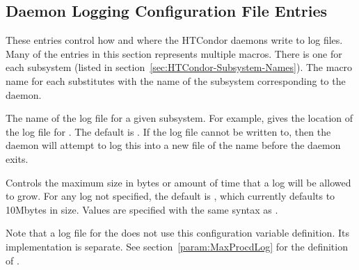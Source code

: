 \subsection{\label{sec:Daemon-Logging-Config-File-Entries}Daemon Logging Configuration File Entries} 

These entries control how and where the HTCondor daemons write to log
files.  Many of the entries in this section represents multiple
macros. There is one for each subsystem (listed
in section~\ref{sec:HTCondor-Subsystem-Names}).
The macro name for each substitutes  with the name
of the subsystem corresponding to the daemon.
\begin{description}
  
\label{param:SubsysLog}
\item[\MacroB{<SUBSYS>\_LOG}]
  The name of
  the log file for a given subsystem.  For example,
   gives the location of the log file for
  . The default is .
  If the log file cannot be written to,
  then the daemon will attempt to log this into a new file of the name
   before the daemon exits.

\label{param:MaxSubsysLog}
\item[\Macro{MAX\_<SUBSYS>\_LOG}]
  Controls the maximum size in bytes or amount of time that a
  log will be allowed to grow. 
  For any log not specified, the default is ,
  which currently defaults to 10Mbytes in size.
  Values are specified with the same syntax as .

  Note that a log file for the  does not use this configuration
  variable definition. 
  Its implementation is separate.  
  See section~\ref{param:MaxProcdLog} for the definition of
  .
 

\end{description}
